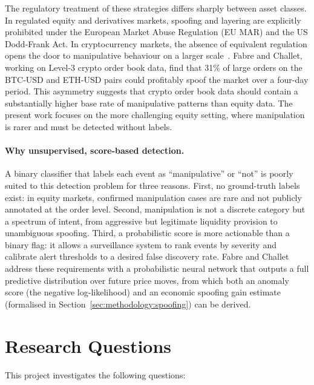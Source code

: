 \documentclass[11pt]{report}
\begin{document}
The regulatory treatment of these strategies differs sharply between asset classes. In regulated equity and derivatives markets, spoofing and layering are explicitly prohibited under the European Market Abuse Regulation (EU MAR) and the US Dodd-Frank Act. In cryptocurrency markets, the absence of equivalent regulation opens the door to manipulative behaviour on a larger scale~\cite{fabre_2025}. Fabre and Challet, working on Level-3 crypto order book data, find that 31\% of large orders on the BTC-USD and ETH-USD pairs could profitably spoof the market over a four-day period. This asymmetry suggests that crypto order book data should contain a substantially higher base rate of manipulative patterns than equity data.
The present work focuses on the more challenging equity setting, where manipulation is rarer and must be detected without labels.

\paragraph{Why unsupervised, score-based detection.}\label{sec:intro:problem}
A binary classifier that labels each event as ``manipulative'' or ``not'' is poorly suited to this detection problem for three reasons. First, no ground-truth labels exist: in equity markets, confirmed manipulation cases are rare and not publicly annotated at the order level. Second, manipulation is not a discrete category but a spectrum of intent, from aggressive but legitimate liquidity provision to unambiguous spoofing. Third, a probabilistic score is more actionable than a binary flag: it allows a surveillance system to rank events by severity and calibrate alert thresholds to a desired false discovery rate. Fabre and Challet~\cite{fabre_2025} address these requirements with a probabilistic neural network that outputs a full predictive distribution over future price moves, from which both an anomaly score (the negative log-likelihood) and an economic spoofing gain estimate (formalised in Section~\ref{sec:methodology:spoofing}) can be derived.


\section{Research Questions}\label{sec:intro:questions}

This project investigates the following questions:
\end{document}
